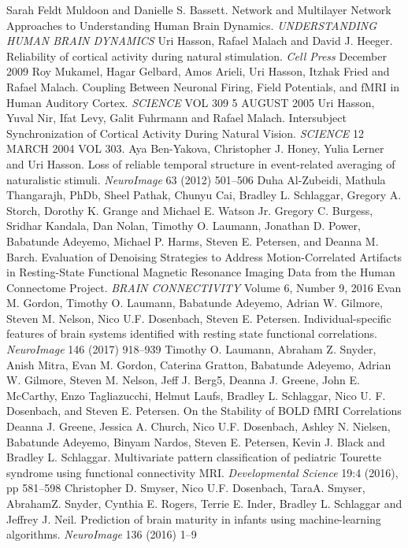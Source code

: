 \documentclass[12pt]{article}
\begin{document}
\begin{thebibliography}{1}
 Sarah Feldt Muldoon and Danielle S. Bassett. Network and Multilayer Network Approaches to Understanding Human Brain Dynamics. \textit{UNDERSTANDING HUMAN BRAIN DYNAMICS}
 Uri Hasson, Rafael Malach and David J. Heeger. Reliability of cortical activity during natural stimulation. \textit{Cell Press} December 2009
 Roy Mukamel, Hagar Gelbard, Amos Arieli, Uri Hasson, Itzhak Fried and Rafael Malach. Coupling Between Neuronal Firing, Field Potentials, and fMRI in Human Auditory Cortex. \textit{SCIENCE} VOL 309 5 AUGUST 2005
 Uri Hasson, Yuval Nir, Ifat Levy, Galit Fuhrmann and Rafael Malach. Intersubject Synchronization of Cortical Activity During Natural Vision. \textit{SCIENCE} 12 MARCH 2004 VOL 303.
 Aya Ben-Yakova, Christopher J. Honey, Yulia Lerner and Uri Hasson. Loss of reliable temporal structure in event-related averaging of naturalistic stimuli. \textit{NeuroImage} 63 (2012) 501–506
 Duha Al-Zubeidi, Mathula Thangarajh, PhDb, Sheel Pathak, Chunyu Cai, Bradley L. Schlaggar, Gregory A. Storch, Dorothy K. Grange and Michael E. Watson Jr.
 Gregory C. Burgess, Sridhar Kandala, Dan Nolan, Timothy O. Laumann, Jonathan D. Power, Babatunde Adeyemo, Michael P. Harms, Steven E. Petersen, and Deanna M. Barch. Evaluation of Denoising Strategies to Address Motion-Correlated Artifacts in Resting-State Functional Magnetic Resonance Imaging Data from the Human Connectome Project. \textit{BRAIN CONNECTIVITY} Volume 6, Number 9, 2016
 Evan M. Gordon, Timothy O. Laumann, Babatunde Adeyemo, Adrian W. Gilmore, Steven M. Nelson, Nico U.F. Dosenbach, Steven E. Petersen. Individual-specific features of brain systems identified with resting state functional correlations. \textit{NeuroImage} 146 (2017) 918–939
 Timothy O. Laumann, Abraham Z. Snyder, Anish Mitra, Evan M. Gordon, Caterina Gratton, Babatunde Adeyemo, Adrian W. Gilmore, Steven M. Nelson, Jeff J. Berg5, Deanna J. Greene, John E. McCarthy, Enzo Tagliazucchi, Helmut Laufs, Bradley L. Schlaggar, Nico U. F. Dosenbach, and Steven E. Petersen. On the Stability of BOLD fMRI Correlations
 Deanna J. Greene, Jessica A. Church, Nico U.F. Dosenbach, Ashley N. Nielsen, Babatunde Adeyemo, Binyam Nardos, Steven E. Petersen, Kevin J. Black and Bradley L. Schlaggar. Multivariate pattern classification of pediatric Tourette syndrome using functional connectivity MRI. \textit{Developmental Science} 19:4 (2016), pp 581–598
 Christopher D. Smyser, Nico U.F. Dosenbach, TaraA. Smyser, AbrahamZ. Snyder, Cynthia E. Rogers, Terrie E. Inder, Bradley L. Schlaggar and Jeffrey J. Neil. Prediction of brain maturity in infants using machine-learning algorithms. \textit{NeuroImage} 136 (2016) 1–9

\end{thebibliography}
\end{document}
